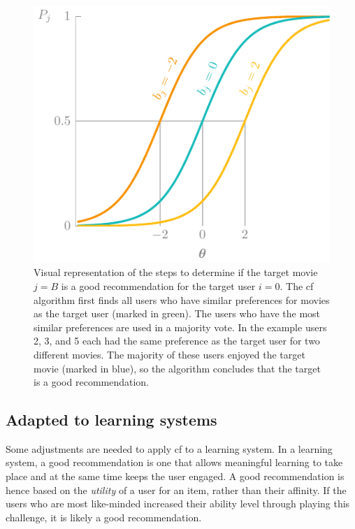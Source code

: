 \begin{figure}
    \centering
    \includegraphics[page=7]{03-education/figures/tikzfigures.pdf}
    \caption[Collaborative filtering algorithm]{Visual representation of the steps to determine if the target movie $j=B$ is a good recommendation for the target user $i=0$. 
    The \gls{cf} algorithm first finds all users who have similar preferences for movies as the target user (marked in green). 
    The users who have the most similar preferences are used in a majority vote. 
    In the example users 2, 3, and 5 each had the same preference as the target user for two different movies.
    The majority of these users enjoyed the target movie (marked in blue), so the algorithm concludes that the target is a good recommendation.}
    \label{fig:cf}
\end{figure}

\subsection{Adapted to learning systems}
\label{sec:adapted-cf}
Some adjustments are needed to apply \gls{cf} to a learning system.
In a learning system, a good recommendation is one that allows meaningful learning to take place and at the same time keeps the user engaged.
A good recommendation is hence based on the \textit{utility} of a user for an item, rather than their affinity.
If the users who are most like-minded increased their ability level through playing this challenge, it is likely a good recommendation.


